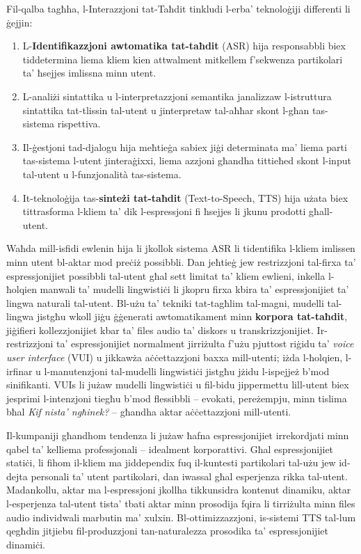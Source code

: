 \begin{multicols}{2}
Fil-qalba tagħha, l-Interazzjoni tat-Taħdit tinkludi l-erba’ teknoloġiji differenti li ġejjin:

\begin{enumerate}
\item L-\textbf{Identifikazzjoni awtomatika tat-taħdit} (ASR) hija responsabbli biex tiddetermina liema kliem kien attwalment mitkellem f’sekwenza partikolari ta’ ħsejjes imlissna minn utent.
\item L-analiżi sintattika u l-interpretazzjoni semantika janalizzaw l-istruttura sintattika tat-tlissin tal-utent u jinterpretaw tal-aħħar skont l-għan tas-sistema rispettiva.
\item Il-ġestjoni tad-djalogu hija meħtieġa sabiex jiġi determinata ma’ liema parti tas-sistema l-utent jinteraġixxi, liema azzjoni għandha tittieħed skont l-input tal-utent u l-funzjonalità tas-sistema.
\item It-teknoloġija tas-\textbf{sinteżi tat-taħdit} (Text-to-Speech, TTS) hija użata biex tittrasforma l-kliem ta’ dik l-espressjoni fi ħsejjes li jkunu prodotti għall-utent. 
\end{enumerate}

Waħda mill-isfidi ewlenin hija li jkollok sistema ASR li tidentifika  l-kliem imlissen minn utent bl-aktar mod preċiż possibbli. Dan jeħtieġ jew restrizzjoni tal-firxa ta’ espressjonijiet possibbli tal-utent għal sett limitat ta’ kliem ewlieni, inkella l-ħolqien manwali ta’ mudelli lingwistiċi li jkopru firxa kbira ta’ espressjonijiet ta’ lingwa naturali tal-utent. Bl-użu ta' tekniki tat-tagħlim tal-magni, mudelli tal-lingwa jistgħu wkoll jiġu ġġenerati awtomatikament minn  \textbf{korpora tat-taħdit}, jiġifieri kollezzjonijiet kbar ta' files audio ta' diskors u transkrizzjonijiet. Ir-restrizzjoni ta' espressjonijiet normalment jirriżulta f’użu pjuttost riġidu ta’ \emph{voice user interface} (VUI) u jikkawża aċċettazzjoni baxxa mill-utenti; iżda l-ħolqien, l-irfinar u l-manutenzjoni tal-mudelli lingwistiċi jistgħu jżidu l-ispejjeż b’mod sinifikanti. VUIs li jużaw mudelli lingwistiċi u fil-bidu jippermettu lill-utent biex jesprimi l-intenzjoni tiegħu b’mod flessibbli -- evokati, pereżempju, minn tislima bħal \emph{Kif nista’ ngħinek?} -- għandha aktar aċċettazzjoni mill-utenti. 

Il-kumpaniji għandhom tendenza li jużaw ħafna espressjonijiet irrekordjati minn qabel ta’ kelliema professjonali – idealment korporattivi. Għal espressjonijiet statiċi, li fihom il-kliem ma jiddependix fuq il-kuntesti partikolari tal-użu jew id-dejta personali ta’ utent partikolari, dan iwassal għal esperjenza rikka tal-utent. Madankollu, aktar ma l-espressjoni jkollha tikkunsidra kontenut dinamiku, aktar l-esperjenza tal-utent tista’ tbati aktar minn prosodija fqira li tirriżulta minn files audio individwali marbutin ma’ xulxin. Bl-ottimizzazzjoni, is-sistemi TTS tal-lum qegħdin jitjiebu fil-produzzjoni tan-naturalezza prosodika ta’ espressjonijiet dinamiċi.


\end{multicols}
